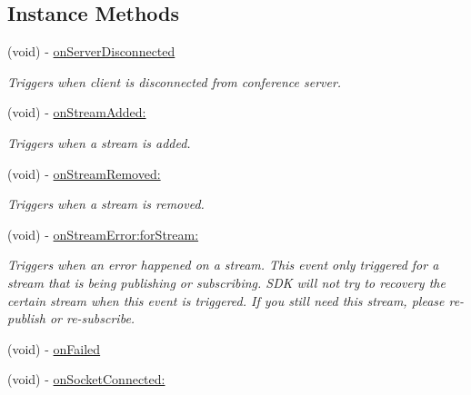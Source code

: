 \subsection*{Instance Methods}
\begin{DoxyCompactItemize}
\item 
\mbox{\label{protocol_c_c_streamer_basic_delegate_01-p_a4ad1d7ffed9486e983cdea2e43dee79b}} 
(void) -\/ \hyperlink{protocol_c_c_streamer_basic_delegate_01-p_a4ad1d7ffed9486e983cdea2e43dee79b}{on\+Server\+Disconnected}
\begin{DoxyCompactList}\small\item\em Triggers when client is disconnected from conference server. \end{DoxyCompactList}\item 
(void) -\/ \hyperlink{protocol_c_c_streamer_basic_delegate_01-p_acc9d38d329fc10a6f6d5a691538986b8}{on\+Stream\+Added\+:}
\begin{DoxyCompactList}\small\item\em Triggers when a stream is added. \end{DoxyCompactList}\item 
(void) -\/ \hyperlink{protocol_c_c_streamer_basic_delegate_01-p_a8524700b14302c2592755b042b3fd5a7}{on\+Stream\+Removed\+:}
\begin{DoxyCompactList}\small\item\em Triggers when a stream is removed. \end{DoxyCompactList}\item 
(void) -\/ \hyperlink{protocol_c_c_streamer_basic_delegate_01-p_aba1d5bd136512679ef362d976a3f30fc}{on\+Stream\+Error\+:for\+Stream\+:}
\begin{DoxyCompactList}\small\item\em Triggers when an error happened on a stream.  This event only triggered for a stream that is being publishing or subscribing. S\+DK will not try to recovery the certain stream when this event is triggered. If you still need this stream, please re-\/publish or re-\/subscribe. \end{DoxyCompactList}\item 
(void) -\/ \hyperlink{protocol_c_c_streamer_basic_delegate_01-p_abb23bf11b723a0639c7b3f549f1c1541}{on\+Failed}
\item 
(void) -\/ \hyperlink{protocol_c_c_streamer_basic_delegate_01-p_a13c0fc26de72b6692ec55ae69827e903}{on\+Socket\+Connected\+:}
\item 

\end{DoxyCompactItemize}

